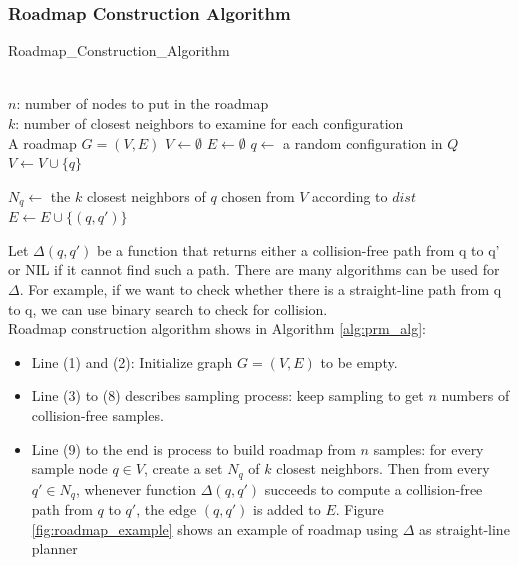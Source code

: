 \documentclass[11pt]{article}
\begin{document}
\subsubsection{Roadmap Construction Algorithm}
\begin{algorithm} 
\caption{Roadmap\_Construction\_Algorithm} 
\label{alg:prm_alg} 
  \begin{algorithmic}[1]
  \REQUIRE~~\\
  	$n$: number of nodes to put in the roadmap\\
  	$k$: number of closest neighbors to examine for each configuration
  \ENSURE~~\\
    A roadmap $G=(V,E)$
    \STATE $V \leftarrow \emptyset$ 
    \STATE $E \leftarrow \emptyset$
      \REPEAT
		\STATE $q \leftarrow$ a random configuration in $Q$      
      \STATE $V \leftarrow V \cup \{q\}$
    \ENDWHILE
    
	  \STATE $N_q \leftarrow$ the $k$ closest neighbors of $q$ chosen from $V$ according to $dist$
	      \STATE $E \leftarrow E \cup \{(q,q')\}$
	    \ENDIF
	  \ENDFOR
	\ENDFOR
    \end{algorithmic}
\end{algorithm}

Let $\Delta(q, q')$ be a function that returns either a collision-free path from q to q' or NIL if it cannot find such a path. There are many algorithms can be used for $\Delta$. For example, if we want to check whether there is a straight-line path from q to q, we can use binary search to check for collision.\\
Roadmap construction algorithm shows in Algorithm \ref{alg:prm_alg}:
\begin{itemize}
\item Line (1) and (2): Initialize graph $G=(V,E)$ to be empty.
\item Line (3) to (8) describes sampling process: keep sampling to get $n$ numbers of collision-free samples.
\item Line (9) to the end is process to build roadmap from $n$ samples: for every sample node $q\in V$, create a set $N_q$ of $k$ closest neighbors. Then from every $q' \in N_q$, whenever function $\Delta(q, q')$ succeeds to compute a collision-free path from $q$ to $q'$, the edge $(q,q')$ is added to $E$. Figure \ref{fig:roadmap_example} shows an example of roadmap using $\Delta$ as straight-line planner
\end{itemize}
\end{document}
